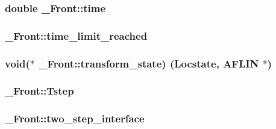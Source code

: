 \subsubsection[{\texorpdfstring{time}{time}}]{\setlength{\rightskip}{0pt plus 5cm}double \+\_\+\+Front\+::time}\hypertarget{struct___front_aa1ed0003e88cf8fc0af42351632a54a6}{}\label{struct___front_aa1ed0003e88cf8fc0af42351632a54a6}
\subsubsection[{\texorpdfstring{time\+\_\+limit\+\_\+reached}{time_limit_reached}}]{ \+\_\+\+Front\+::time\+\_\+limit\+\_\+reached}\hypertarget{struct___front_a99d3e459f3f53dfb2f01c2e05629d2c7}{}\label{struct___front_a99d3e459f3f53dfb2f01c2e05629d2c7}
\subsubsection[{\texorpdfstring{transform\+\_\+state}{transform_state}}]{\setlength{\rightskip}{0pt plus 5cm}void($\ast$ \+\_\+\+Front\+::transform\+\_\+state) ({\bf Locstate}, {\bf A\+F\+L\+IN} $\ast$)}\hypertarget{struct___front_ac865aebe34484528eb05bea24661d1c9}{}\label{struct___front_ac865aebe34484528eb05bea24661d1c9}
\subsubsection[{\texorpdfstring{Tstep}{Tstep}}]{ \+\_\+\+Front\+::\+Tstep}\hypertarget{struct___front_a5a8004bbf94bf456062237a6a8ca7ae7}{}\label{struct___front_a5a8004bbf94bf456062237a6a8ca7ae7}
\subsubsection[{\texorpdfstring{two\+\_\+step\+\_\+interface}{two_step_interface}}]{ \+\_\+\+Front\+::two\+\_\+step\+\_\+interface}\hypertarget{struct___front_a5bba1079a9ea5cdc9b4bf1bb03d7d179}{}\label{struct___front_a5bba1079a9ea5cdc9b4bf1bb03d7d179}
